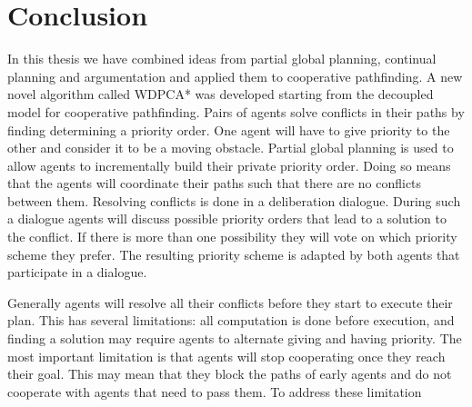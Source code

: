 \section{Conclusion}
In this thesis we have combined ideas from partial global planning, continual
planning and argumentation and applied them to cooperative pathfinding.
A new novel algorithm called WDPCA* was developed starting from the decoupled
model for cooperative pathfinding. Pairs of agents solve conflicts in their
paths by finding determining a priority order. One agent will have to give
priority to the other and consider it to be a moving obstacle. Partial global
planning is used to allow agents to incrementally build their private priority
order. Doing so means that the agents will coordinate their paths such that
there are no conflicts between them. Resolving conflicts is done in a
deliberation dialogue. During such a dialogue agents will discuss possible
priority orders that lead to a solution to the conflict. If there is more than
one possibility they will vote on which priority scheme they prefer. The
resulting priority scheme is adapted by both agents that participate in a
dialogue.

Generally agents will resolve all their conflicts before they start to execute
their plan. This has several limitations: all computation is done before
execution, and finding a solution may require agents to alternate giving and
having priority. The most important limitation is that agents will stop
cooperating once they reach their goal. This may mean that they block the paths
of early agents and do not cooperate with agents that need to pass them. To
address these limitation
